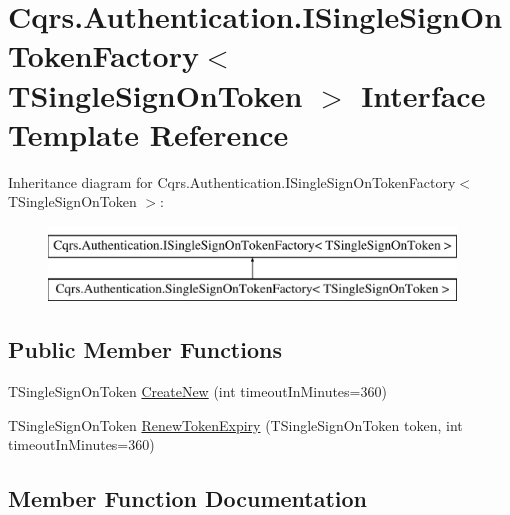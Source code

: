 \hypertarget{interfaceCqrs_1_1Authentication_1_1ISingleSignOnTokenFactory}{}\section{Cqrs.\+Authentication.\+I\+Single\+Sign\+On\+Token\+Factory$<$ T\+Single\+Sign\+On\+Token $>$ Interface Template Reference}
\label{interfaceCqrs_1_1Authentication_1_1ISingleSignOnTokenFactory}
Inheritance diagram for Cqrs.\+Authentication.\+I\+Single\+Sign\+On\+Token\+Factory$<$ T\+Single\+Sign\+On\+Token $>$\+:\begin{figure}[H]
\begin{center}
\leavevmode
\includegraphics[height=2.000000cm]{interfaceCqrs_1_1Authentication_1_1ISingleSignOnTokenFactory}
\end{center}
\end{figure}
\subsection*{Public Member Functions}
\begin{DoxyCompactItemize}
\item 
T\+Single\+Sign\+On\+Token \hyperlink{interfaceCqrs_1_1Authentication_1_1ISingleSignOnTokenFactory_ad0795fb60ca13dd24db18556089e2834}{Create\+New} (int timeout\+In\+Minutes=360)
\item 
T\+Single\+Sign\+On\+Token \hyperlink{interfaceCqrs_1_1Authentication_1_1ISingleSignOnTokenFactory_ab436004ad1631140f7a58927cbacd8c4}{Renew\+Token\+Expiry} (T\+Single\+Sign\+On\+Token token, int timeout\+In\+Minutes=360)
\end{DoxyCompactItemize}


\subsection{Member Function Documentation}
\mbox{\label{interfaceCqrs_1_1Authentication_1_1ISingleSignOnTokenFactory_ad0795fb60ca13dd24db18556089e2834}} 

